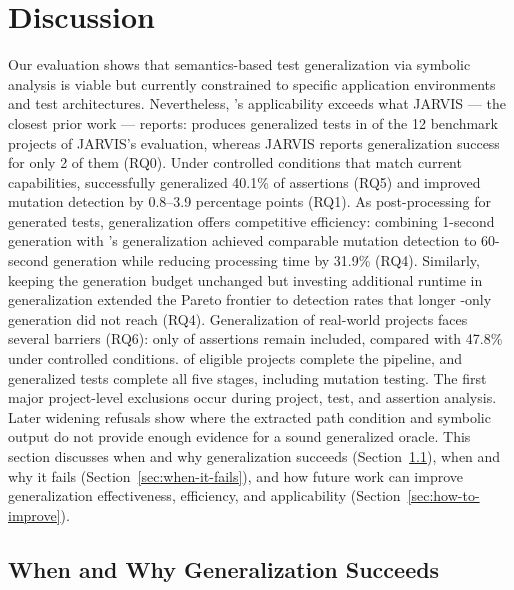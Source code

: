 \section{Discussion}%
\label{sec:discussion}

Our evaluation shows that
semantics-based test generalization via symbolic analysis
is viable but currently constrained to
specific application environments and test architectures.
Nevertheless, \ToolTeralizer{}'s applicability exceeds
what JARVIS --- the closest prior work --- reports:
\ToolTeralizer{} produces generalized tests in
\TzRqzeroCensusPopulatedProjects{} of the 12 benchmark projects of JARVIS's evaluation,
whereas JARVIS reports generalization success for only 2 of them (RQ0).
Under controlled conditions that match current capabilities,
\ToolTeralizer{} successfully generalized 40.1\% of assertions (RQ5)
and improved mutation detection by 0.8--3.9 percentage points (RQ1).
As post-processing for generated tests,
generalization offers competitive efficiency:
combining 1-second \ToolEvoSuite{} generation with \ToolTeralizer{}'s generalization
achieved comparable mutation detection to 60-second generation
while reducing processing time by 31.9\% (RQ4).
Similarly, keeping the generation budget unchanged
but investing additional runtime in generalization
extended the Pareto frontier to detection rates
that longer \ToolEvoSuite{}-only generation did not reach (RQ4).
Generalization of real-world projects faces several barriers (RQ6):
only \TzRealworldAssertionsIncludedPct{} of assertions remain included,
compared with 47.8\% under controlled conditions.
\TzRealworldApplicabilityProjects{} of \TzRealworldEligibleProjects{} eligible projects complete the
pipeline, and \TzRealworldGeneralizationsFinalUsable{} generalized tests complete all five stages,
including mutation testing. The first major project-level exclusions occur during project, test, and assertion analysis.
Later widening refusals show where the extracted path condition and symbolic output do not provide
enough evidence for a sound generalized oracle.
This section discusses when and why generalization succeeds (Section~\ref{sec:when-it-works}),
when and why it fails (Section~\ref{sec:when-it-fails}),
and how future work
can improve generalization effectiveness, efficiency, and applicability (Section~\ref{sec:how-to-improve}).

\subsection{When and Why Generalization Succeeds}%
\label{sec:when-it-works}

